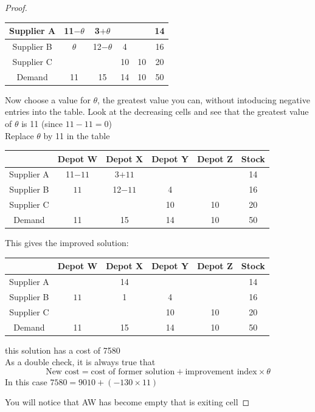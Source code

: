 \documentclass[a4paper]{article}
\begin{document}
\begin{eg}
\begin{proof}
\begin{center}
\begin{tabular}{|c|c|c|c|c|c|}
				Supplier A & 11$-\theta$ & 3$+\theta$  &         &         & 14    \\
				\hline
				Supplier B & $\theta$    & 12$-\theta$ & 4       &         & 16    \\
				\hline
				Supplier C &             &             & 10      & 10      & 20    \\
				\hline
				Demand     & 11          & 15          & 14      & 10      & 50    \\
				\hline
			\end{tabular}
		\end{center}
		Now choose a value for $\theta$, the greatest value you can, without intoducing negative entries into the table. Look at the decreasing cells and see that the greatest value of $\theta$ is 11 (since $11-11=0$)\\

		Replace $\theta$ by 11 in the table
		\begin{center}
			\begin{tabular}{|c|c|c|c|c|c|}
				\hline
				           & Depot W & Depot X & Depot Y & Depot Z & Stock \\
				\hline
				Supplier A & 11$-11$ & 3$+11$  &         &         & 14    \\
				\hline
				Supplier B & $11$    & 12$-11$ & 4       &         & 16    \\
				\hline
				Supplier C &         &         & 10      & 10      & 20    \\
				\hline
				Demand     & 11      & 15      & 14      & 10      & 50    \\
				\hline
			\end{tabular}
		\end{center}
		This gives the improved solution:
		\begin{center}
			\begin{tabular}{|c|c|c|c|c|c|}
				\hline
				           & Depot W & Depot X & Depot Y & Depot Z & Stock \\
				\hline
				Supplier A &         & 14      &         &         & 14    \\
				\hline
				Supplier B & $11$    & 1       & 4       &         & 16    \\
				\hline
				Supplier C &         &         & 10      & 10      & 20    \\
				\hline
				Demand     & 11      & 15      & 14      & 10      & 50    \\
				\hline
			\end{tabular}
		\end{center}
		this solution has a cost of 7580\\

		As a double check, it is always true that
		\[
			\text{New cost}=\text{cost of former solution}+\text{improvement index}\times\theta
		\]
		In this case $7580=9010+(-130\times 11)$

		You will notice that AW has become empty that is exiting cell
	\end{proof}
\end{eg}
\end{document}
